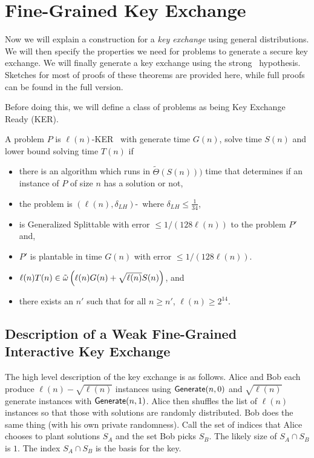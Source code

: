 \section{Fine-Grained Key Exchange}
\label{sec:FineGrainedKeyExchange}

Now we will explain a construction for a \emph{key exchange} using general distributions. We will then specify the properties we need for problems to generate a secure key exchange. We will finally generate a key exchange using the strong \zkclique~hypothesis. Sketches for most of proofs of these theorems are provided here, while full proofs can be found in the full version.

\newcommand{\keyER}{KER}

Before doing this, we will define a class of problems as being Key Exchange Ready (KER).

\begin{definition}
	A problem $P$ is $\ell(n)$-\keyER~ with generate time $G(n)$, solve time $S(n)$ and lower bound solving time $T(n)$ if
	\begin{itemize}
		\item there is an algorithm which runs in $\tilde\Theta(S(n)))$ time that determines if an instance of $P$ of size $n$ has a solution or not,
		\item the problem is $(\ell(n), \delta_{LH})$-\ACLH~where $\delta_{LH} \le \frac 1 {34}$,
		\item is Generalized Splittable with error $\leq 1/(128 \ell(n))$ to the problem $P'$ and,
		\item $P'$ is plantable in time $G(n)$ with error $\leq 1/(128 \ell(n))$.
		\item $\ell(n)T(n) \in \~ \omega\left(\ell(n)G(n) + \sqrt{\ell(n)}S(n)\right)$, and
		\item there exists an $n'$ such that for all $n \ge n'$, $\ell(n) \ge 2^{14}$.
	\end{itemize}
\end{definition}

\subsection{Description of a Weak Fine-Grained Interactive Key Exchange}

The high level description of the key exchange is as follows. Alice and Bob each produce $\ell(n) - \sqrt{\ell(n)}$ instances using $\Generate(n,0)$ and $\sqrt{\ell(n)}$ generate instances with $\Generate(n,1)$. Alice then shuffles the list of $\ell(n)$ instances so that those with solutions are randomly distributed. Bob does the same thing (with his own private randomness). Call the set of indices that Alice chooses to plant solutions $S_A$ and the set Bob picks $S_B$. The likely size of $S_A \cap S_B$ is $1$. The index $S_A \cap S_B$ is the basis for the key.


